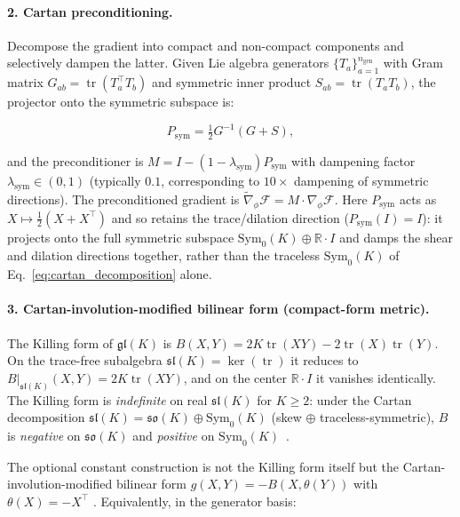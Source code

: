\documentclass[twoside,11pt]{article}
\begin{document}
\paragraph{2. Cartan preconditioning.}
Decompose the gradient into compact and non-compact components and selectively dampen the latter. Given Lie algebra generators $\{T_a\}_{a=1}^{n_{\mathrm{gen}}}$ with Gram matrix $G_{ab} = \operatorname{tr}(T_a^\top T_b)$ and symmetric inner product $S_{ab} = \operatorname{tr}(T_a T_b)$, the projector onto the symmetric subspace is:

\begin{equation}
P_{\mathrm{sym}} = \tfrac{1}{2}G^{-1}(G + S),
\end{equation}

and the preconditioner is $M = I - (1 - \lambda_{\mathrm{sym}}) P_{\mathrm{sym}}$ with dampening factor $\lambda_{\mathrm{sym}} \in (0, 1)$ (typically $0.1$, corresponding to $10\times$ dampening of symmetric directions). The preconditioned gradient is $\tilde{\nabla}_\phi \mathcal{F} = M \cdot \nabla_\phi \mathcal{F}$. Here $P_{\mathrm{sym}}$ acts as $X \mapsto \tfrac{1}{2}(X + X^\top)$ and so retains the trace/dilation direction ($P_{\mathrm{sym}}(I) = I$): it projects onto the full symmetric subspace $\mathrm{Sym}_0(K) \oplus \mathbb{R}\cdot I$ and damps the shear and dilation directions together, rather than the traceless $\mathrm{Sym}_0(K)$ of Eq.~\eqref{eq:cartan_decomposition} alone.

\paragraph{3. Cartan-involution-modified bilinear form (compact-form metric).}
The Killing form of $\mathfrak{gl}(K)$ is $B(X, Y) = 2K \operatorname{tr}(XY) - 2\operatorname{tr}(X)\operatorname{tr}(Y)$. On the trace-free subalgebra $\mathfrak{sl}(K) = \ker(\operatorname{tr})$ it reduces to $B|_{\mathfrak{sl}(K)}(X,Y) = 2K\operatorname{tr}(XY)$, and on the center $\mathbb{R}\cdot I$ it vanishes identically. The Killing form is \emph{indefinite} on real $\mathfrak{sl}(K)$ for $K\geq 2$: under the Cartan decomposition $\mathfrak{sl}(K) = \mathfrak{so}(K) \oplus \mathrm{Sym}_0(K)$ (skew $\oplus$ traceless-symmetric), $B$ is \emph{negative} on $\mathfrak{so}(K)$ and \emph{positive} on $\mathrm{Sym}_0(K)$~\citep{Hall2015,Gallier2020}.

The optional constant construction is not the Killing form itself but the Cartan-involution-modified bilinear form $g(X, Y) = -B(X, \theta(Y))$ with $\theta(X) = -X^\top$ \citep[Ch.~VI]{Knapp2002}. Equivalently, in the generator basis:
\end{document}
